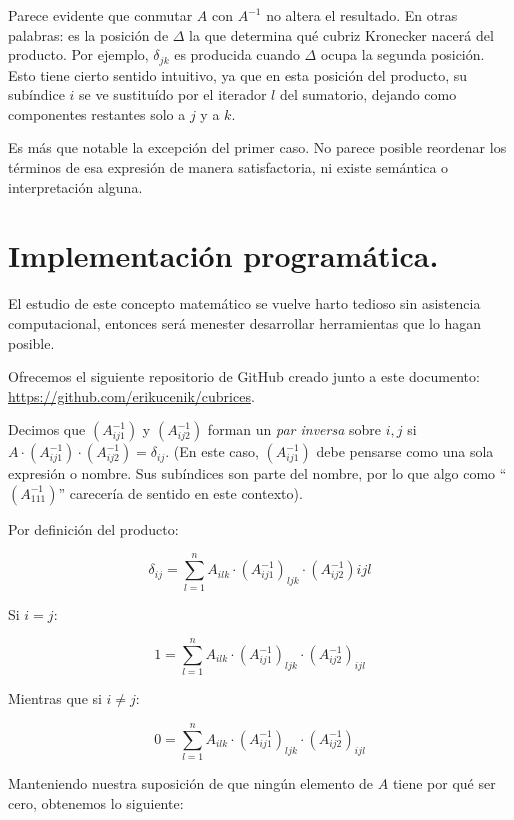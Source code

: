 \documentclass[a4paper, titlepage]{article}
\begin{document}
Parece evidente que conmutar $A$ con $A^{-1}$ no altera el resultado. En otras palabras: es la posición de $\Delta$ la que determina qué cubriz Kronecker nacerá del producto. Por ejemplo, $\delta_{jk}$ es producida cuando $\Delta$ ocupa la segunda posición. Esto tiene cierto sentido intuitivo, ya que en esta posición del producto, su subíndice $i$ se ve sustituído por el iterador $l$ del sumatorio, dejando como componentes restantes solo a $j$ y a $k$.

Es más que notable la excepción del primer caso. No parece posible reordenar los términos de esa expresión de manera satisfactoria, ni existe semántica o interpretación alguna.

\newpage

\section{Implementación programática.}

El estudio de este concepto matemático se vuelve harto tedioso sin asistencia computacional, entonces será menester desarrollar herramientas que lo hagan posible.

Ofrecemos el siguiente repositorio de GitHub creado junto a este documento: \href{https://github.com/erikucenik/cubrices}{https://github.com/erikucenik/cubrices}.

\iffalse

Decimos que $(A_{ij1}^{-1})$ y $(A_{ij2}^{-1})$ forman un \textit{par inversa} sobre $i,j$ si ${A\cdot (A_{ij1}^{-1}) \cdot (A_{ij2}^{-1}) = \delta_{ij}}$. (En este caso, $(A_{ij1}^{-1})$ debe pensarse como una sola expresión o nombre. Sus subíndices son parte del nombre, por lo que algo como ``$(A_{111}^{-1})$'' carecería de sentido en este contexto).

Por definición del producto:

$$\delta_{ij} = \sum\limits_{l=1}^{n} A_{ilk} \cdot (A_{ij1}^{-1})_{ljk} \cdot (A_{ij2}^{-1})ijl$$

Si $i = j$:

$$1 = \sum\limits_{l=1}^{n} A_{ilk} \cdot (A_{ij1}^{-1})_{ljk} \cdot (A_{ij2}^{-1})_{ijl}$$

Mientras que si $i \neq j$:

$$0 = \sum\limits_{l=1}^{n} A_{ilk} \cdot (A_{ij1}^{-1})_{ljk} \cdot (A_{ij2}^{-1})_{ijl}$$

Manteniendo nuestra suposición de que ningún elemento de $A$ tiene por qué ser cero, obtenemos lo siguiente:
\end{document}

